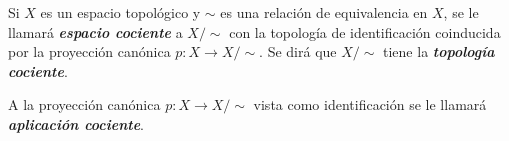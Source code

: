 

\begin{definition}
Si $X$ es un espacio topológico y $\sim$ es una relación de equivalencia en $X$, se le llamará \emph{\bfseries espacio cociente} a $X/\sim$ con la topología de identificación coinducida por la proyección canónica $p : X \longrightarrow X/\sim$. Se dirá que $X/\sim$ tiene la \emph{\bfseries topología cociente}.
\end{definition}

\begin{definition}
A la proyección canónica $p : X \longrightarrow X/\sim$ vista como identificación se le llamará \emph{\bfseries aplicación cociente}.
\end{definition}
